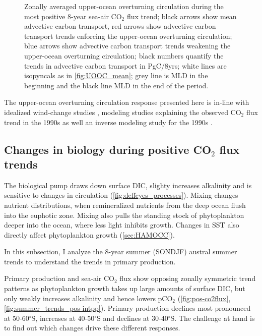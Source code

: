 \begin{figure}[hbt]
	\centering
    \captionsetup[subfigure]{labelformat=empty,justification=centering}
	\caption{Zonally averaged upper-ocean overturning circulation during the most positive 8-year sea-air CO$_2$ flux trend; black arrows show mean advective carbon transport, red arrows show advective carbon transport trends enforcing the upper-ocean overturning circulation; blue arrows show advective carbon transport trends weakening the upper-ocean overturning circulation; black numbers quantify the trends in advective carbon transport in PgC/8yrs; white lines are isopyncals as in \autoref{fig:UOOC_mean}; grey line is \ac{MLD} in the beginning and the black line MLD in the end of the period.}
	\label{fig:UOOC_pos}
\end{figure}

The upper-ocean overturning circulation response presented here is in-line with idealized wind-change studies \citep{Lauderdale2013}, modeling studies explaining the observed CO$_2$ flux trend in the 1990s \citep{LeQuere2007,Lovenduski2007,Lovenduski2008} as well an inverse modeling study for the 1990s \citep{DeVries2017}.


\clearpage

\subsection{Changes in biology during positive CO$_2$ flux trends}
\label{sec:trends_pos_biology}
The biological pump draws down surface \acf{DIC}, slighty increases alkalinity and is sensitive to changes in circulation (\autoref{fig:deffeyes_processes}). Mixing changes nutrient distributions, when remineralized nutrients from the deep ocean flush into the euphotic zone. Mixing also pulls the standing stock of phytoplankton deeper into the ocean, where less light inhibits growth. Changes in \acs{SST} also directly affect phytoplankton growth (\autoref{sec:HAMOCC}). 

In this subsection, I analyze the 8-year summer (SONDJF) austral summer trends to understand the trends in primary production.\newline
  
Primary production and sea-air CO$_2$ flux show opposing zonally symmetric trend patterns as phytoplankton growth takes up large amounts of surface \acs{DIC}, but only weakly increases alkalinity  and hence lowers pCO$_2$ (\autoref{fig:pos-co2flux}, \ref{fig:summer_trends_pos-intpp}). Primary production declines most pronounced at 50-60$^\circ$S, increases at 40-50$^\circ$S and declines at 30-40$^\circ$S.  The challenge at hand is to find out which changes drive these different responses.



